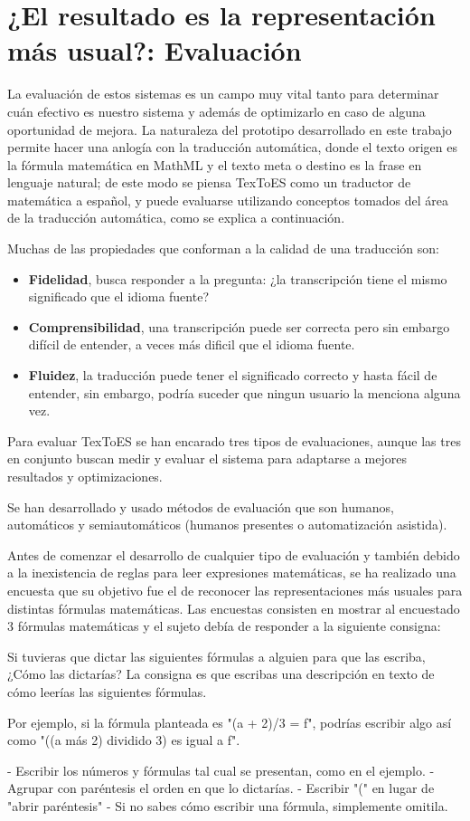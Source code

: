 \section{¿El resultado es la representación más usual?: Evaluación}

La evaluación de estos sistemas es un campo muy vital tanto para determinar cuán efectivo es nuestro sistema y además de optimizarlo en caso de alguna oportunidad de mejora. La naturaleza del prototipo desarrollado en este trabajo permite hacer una anlogía con la traducción automática, donde el texto origen es la fórmula matemática en MathML y el texto meta o destino es la frase en lenguaje natural; de este modo se piensa TexToES como un traductor de matemática a español, y puede evaluarse utilizando conceptos tomados del área de la traducción automática, como se explica a continuación.

Muchas de las propiedades que conforman a la calidad de una traducción son:
\begin{itemize}
\item \textbf{Fidelidad}, busca responder a la pregunta: ¿la transcripción tiene el mismo significado que el idioma fuente?
\item \textbf{Comprensibilidad}, una transcripción puede ser correcta pero sin embargo difícil de entender, a veces más dificil que el idioma fuente.
\item \textbf{Fluidez}, la traducción puede tener el significado correcto y hasta fácil de entender, sin embargo, podría suceder que ningun usuario la menciona alguna vez.
\end{itemize}

Para evaluar TexToES se han encarado tres tipos de evaluaciones, aunque las tres en conjunto buscan medir y evaluar el sistema para adaptarse a mejores resultados y optimizaciones.

Se han desarrollado y usado métodos de evaluación que son humanos, automáticos y semiautomáticos (humanos presentes o automatización asistida).

Antes de comenzar el desarrollo de cualquier tipo de evaluación y también debido a la inexistencia de reglas para leer expresiones matemáticas, se ha realizado una encuesta que su objetivo fue el de reconocer las representaciones más usuales para distintas fórmulas matemáticas. Las encuestas consisten en mostrar al encuestado 3 fórmulas matemáticas y el sujeto debía de responder a la siguiente consigna:\\

\begin{tcolorbox}
Si tuvieras que dictar las siguientes fórmulas a alguien para que las escriba, ¿Cómo las dictarías?
La consigna es que escribas una descripción en texto de cómo leerías las siguientes fórmulas.

Por ejemplo, si la fórmula planteada es "(a + 2)/3 = f", podrías escribir algo así como "((a más 2) dividido 3) es igual a f".

- Escribir los números y fórmulas tal cual se presentan, como en el ejemplo.
- Agrupar con paréntesis el orden en que lo dictarías.
- Escribir "(" en lugar de "abrir paréntesis"
- Si no sabes cómo escribir una fórmula, simplemente omitila.
\end{tcolorbox}

